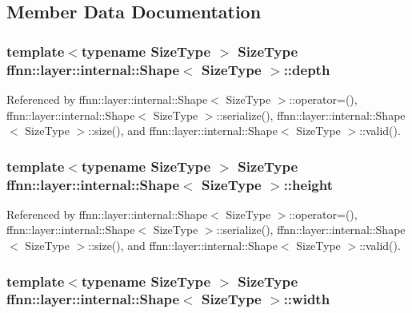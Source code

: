 \subsection{Member Data Documentation}
\hypertarget{structffnn_1_1layer_1_1internal_1_1_shape_a16a6855288e10d47c4793b03b46c4d52}{
\subsubsection[{depth}]{\setlength{\rightskip}{0pt plus 5cm}template$<$typename Size\-Type $>$ Size\-Type {\bf ffnn\-::layer\-::internal\-::\-Shape}$<$ Size\-Type $>$\-::depth}}\label{structffnn_1_1layer_1_1internal_1_1_shape_a16a6855288e10d47c4793b03b46c4d52}


Referenced by ffnn\-::layer\-::internal\-::\-Shape$<$ Size\-Type $>$\-::operator=(), ffnn\-::layer\-::internal\-::\-Shape$<$ Size\-Type $>$\-::serialize(), ffnn\-::layer\-::internal\-::\-Shape$<$ Size\-Type $>$\-::size(), and ffnn\-::layer\-::internal\-::\-Shape$<$ Size\-Type $>$\-::valid().

\hypertarget{structffnn_1_1layer_1_1internal_1_1_shape_ac48f7c8b470265b0f886393e32dab4e7}{
\subsubsection[{height}]{\setlength{\rightskip}{0pt plus 5cm}template$<$typename Size\-Type $>$ Size\-Type {\bf ffnn\-::layer\-::internal\-::\-Shape}$<$ Size\-Type $>$\-::height}}\label{structffnn_1_1layer_1_1internal_1_1_shape_ac48f7c8b470265b0f886393e32dab4e7}


Referenced by ffnn\-::layer\-::internal\-::\-Shape$<$ Size\-Type $>$\-::operator=(), ffnn\-::layer\-::internal\-::\-Shape$<$ Size\-Type $>$\-::serialize(), ffnn\-::layer\-::internal\-::\-Shape$<$ Size\-Type $>$\-::size(), and ffnn\-::layer\-::internal\-::\-Shape$<$ Size\-Type $>$\-::valid().

\hypertarget{structffnn_1_1layer_1_1internal_1_1_shape_ae8155a14b907ad1af92d108d5d77e12c}{
\subsubsection[{width}]{\setlength{\rightskip}{0pt plus 5cm}template$<$typename Size\-Type $>$ Size\-Type {\bf ffnn\-::layer\-::internal\-::\-Shape}$<$ Size\-Type $>$\-::width}}\label{structffnn_1_1layer_1_1internal_1_1_shape_ae8155a14b907ad1af92d108d5d77e12c}


